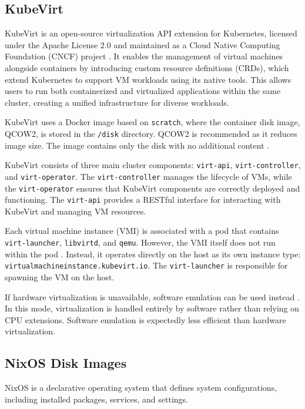 \subsection{KubeVirt}
KubeVirt is an open-source virtualization API extension for Kubernetes, licensed under the Apache License 2.0 \Parencite{kubevirt_license} and maintained as a Cloud Native Computing Foundation (CNCF) project \parencite{kubevirt_cncf}. It enables the management of virtual machines alongside containers by introducing custom resource definitions (CRDs), which extend Kubernetes to support VM workloads using its native tools. This allows users to run both containerized and virtualized applications within the same cluster, creating a unified infrastructure for diverse workloads.

KubeVirt uses a Docker image based on \texttt{scratch}, where the container disk image, QCOW2, is stored in the \texttt{/disk} directory. QCOW2 is recommended as it reduces image size. The image contains only the disk with no additional content \Parencite{kubevirt_disks_volumes}.

KubeVirt consists of three main cluster components: \texttt{virt-api}, \texttt{virt-\allowbreak controller}, and \texttt{virt-operator}. The \texttt{virt-controller} manages the lifecycle of VMs, while the \texttt{virt-operator} ensures that KubeVirt components are correctly deployed and functioning. The \texttt{virt-api} provides a RESTful interface for interacting with KubeVirt and managing VM resources.

Each virtual machine instance (VMI) is associated with a pod that contains \texttt{virt-launcher}, \texttt{libvirtd}, and \texttt{qemu}. However, the VMI itself does not run within the pod \Parencite{kubevirt_architecture}. Instead, it operates directly on the host as its own instance type: \texttt{virtualmachineinstance.kubevirt.io}. The \texttt{virt-\allowbreak launcher} is responsible for spawning the VM on the host.

If hardware virtualization is unavailable, software emulation can be used instead \Parencite{kubevirt_installation}. In this mode, virtualization is handled entirely by software rather than relying on CPU extensions. Software emulation is expectedly less efficient than hardware virtualization.

\subsection{NixOS Disk Images}
NixOS is a declarative operating system that defines system configurations, including installed packages, services, and settings.

